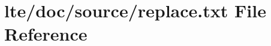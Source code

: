 \hypertarget{lte_2doc_2source_2replace_8txt}{}\section{lte/doc/source/replace.txt File Reference}
\label{lte_2doc_2source_2replace_8txt}
